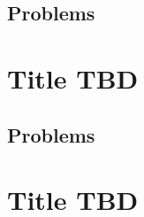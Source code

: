 \documentclass[letterpaper,11pt,oneside,reqno]{book}
\numberwithin{equation}{chapter}  %
\theoremstyle{definition}
\begin{document}
\section{Problems}
















\chapter{Title TBD}
\label{chap:lecture13}










































\section{Problems}
















\chapter{Title TBD}
\label{chap:lecture14}
\end{document}
